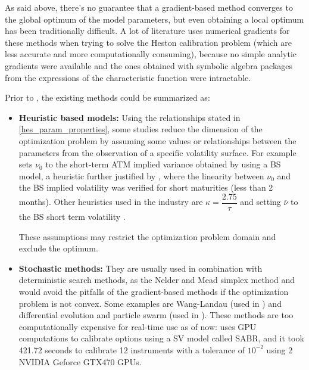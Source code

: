 \documentclass[12,twoside]{mammeTFM}
\theoremstyle{definition}
\theoremstyle{remark}
\begin{document}
As said above, there's no guarantee that a gradient-based method converges to the global optimum of the model parameters, but even obtaining a local optimum has been traditionally difficult. A lot of literature uses numerical gradients\cite{ge12} for these methods when trying to solve the Heston calibration problem (which are less accurate and more computationally consuming), because no simple analytic gradients were available and the ones obtained with symbolic algebra packages from the expressions of the characteristic function were intractable.

Prior to \cite{cui17}, the existing methods could be summarized as:

\begin{itemize}
\item{\textbf{Heuristic based models:}}
Using the relationships stated in \ref{hes_param_properties}, some studies reduce the dimension of the optimization problem by assuming some values or relationships between the parameters from the observation of a specific volatility surface. For example \cite{gat06} sets $\nu_0$ to the short-term ATM implied variance obtained by using a BS model, a heuristic further justified by \cite{che07}, where the linearity between $\nu_0$ and the BS implied volatility was verified for short maturities (less than 2 months). Other heuristics used in the industry are $\kappa = \dfrac{2.75}{\tau}$ and setting $\overline{\nu}$ to the BS short term volatility \cite{cla11}.

These assumptions may restrict the optimization problem domain and exclude the optimum.
\item{\textbf{Stochastic methods:}}
They are usually used in combination with deterministic search methods, as the Nelder and Mead simplex method \cite{lag98} and would avoid the pitfalls of the gradient-based methods if the optimization problem is not convex. Some examples are Wang-Landau (used in \cite{che07}) and differential evolution and particle swarm (used in \cite{gil12_2}).
These methods are too computationally expensive for real-time use as of now: \cite{fer13} uses GPU computations to calibrate options using a SV model called SABR, and it took 421.72 seconds to calibrate 12 instruments with a tolerance of $10^{-2}$ using 2 NVIDIA Geforce GTX470 GPUs.


\end{itemize}
\end{document}
